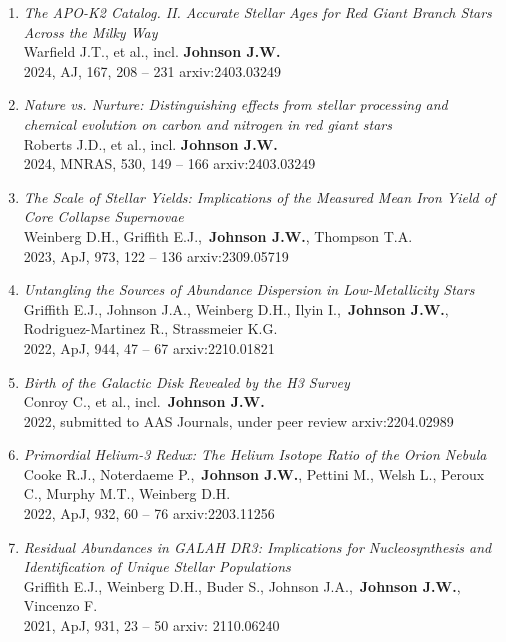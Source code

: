 \documentclass[cv.tex]{subfiles}
\begin{document}
\begin{enumerate}
	\item \textit{The APO-K2 Catalog. II. Accurate Stellar Ages for Red Giant
	Branch Stars Across the Milky Way}
	\\
	Warfield J.T., et al., incl. \textbf{Johnson J.W.}
	\\
	2024, AJ, 167, 208 -- 231 \hfill arxiv:2403.03249

	\item \textit{Nature vs. Nurture: Distinguishing effects from stellar
	processing and chemical evolution on carbon and nitrogen in red giant stars}
	\\
	Roberts J.D., et al., incl. \textbf{Johnson J.W.}
	\\
	2024, MNRAS, 530, 149 -- 166 \hfill arxiv:2403.03249

	\item \textit{The Scale of Stellar Yields: Implications of the Measured
	Mean Iron Yield of Core Collapse Supernovae}
	\\
	Weinberg D.H., Griffith E.J.,~\textbf{Johnson J.W.}, Thompson T.A.
	\\
	2023, ApJ, 973, 122 -- 136 \hfill arxiv:2309.05719

	\item \textit{Untangling the Sources of Abundance Dispersion in
	Low-Metallicity Stars}
	\\
	Griffith E.J., Johnson J.A., Weinberg D.H., Ilyin I.,~\textbf{Johnson J.W.},
	Rodriguez-Martinez R., Strassmeier K.G.
	\\
	2022, ApJ, 944, 47 -- 67 \hfill arxiv:2210.01821

	\item \textit{Birth of the Galactic Disk Revealed by the H3 Survey}
	\\
	Conroy C., et al., incl.~\textbf{Johnson J.W.}
	\\
	2022, submitted to AAS Journals, under peer review \hfill arxiv:2204.02989

	\item \textit{Primordial Helium-3 Redux: The Helium Isotope Ratio of the
	Orion Nebula}
	\\
	Cooke R.J., Noterdaeme P.,~\textbf{Johnson J.W.}, Pettini M., Welsh L.,
	Peroux C., Murphy M.T., Weinberg D.H.
	\\
	2022, ApJ, 932, 60 -- 76 \hfill arxiv:2203.11256

	\item \textit{Residual Abundances in GALAH DR3: Implications for
	Nucleosynthesis and Identification of Unique Stellar Populations}
	\\
	Griffith E.J., Weinberg D.H., Buder S., Johnson J.A.,~\textbf{Johnson J.W.},
	Vincenzo F.
	\\
	2021, ApJ, 931, 23 -- 50 \hfill arxiv: 2110.06240


\end{enumerate}
\end{document}
